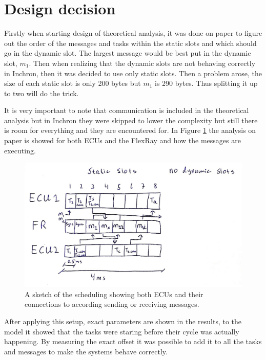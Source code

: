 \section{Design decision}
Firstly when starting design of theoretical analysis, it was done on paper to figure out the order of the messages and tasks within the static slots and which should go in the dynamic slot. The largest message would be best put in the dynamic slot, $m_1$. Then when realizing that the dynamic slots are not behaving correctly in Inchron, then it was decided to use only static slots. Then a problem arose, the size of each static slot is only 200 bytes but $m_1$ is 290 bytes. Thus splitting it up to two will do the trick.

It is very important to note that communication is included in the theoretical analysis but in Inchron they were skipped to lower the complexity but still there is room for everything and they are encountered for. In Figure \ref{fig:FRdrawing} the analysis on paper is showed for both ECUs and the FlexRay and how the messages are executing.
\begin{figure}[h!]
	\begin{center}
		\includegraphics[width=0.9\linewidth]{img/FR-drawing-2}
		\caption{A sketch of the scheduling showing both ECUs and their connections to according sending or receiving messages.}
		\label{fig:FRdrawing}
	\end{center}
\end{figure}

After applying this setup, exact parameters are shown in the results, to the model it showed that the tasks were staring before their cycle was actually happening. By measuring the exact offset it was possible to add it to all the tasks and messages to make the systems behave correctly. 

